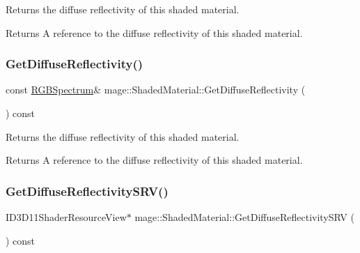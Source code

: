 Returns the diffuse reflectivity of this shaded material.

\begin{DoxyReturn}{Returns}
A reference to the diffuse reflectivity of this shaded material. 
\end{DoxyReturn}
\hypertarget{structmage_1_1_shaded_material_ae2c5d441c51b40a3c940785a002f59ec}{}\label{structmage_1_1_shaded_material_ae2c5d441c51b40a3c940785a002f59ec} 
\subsubsection{\texorpdfstring{Get\+Diffuse\+Reflectivity()}{GetDiffuseReflectivity()}\hspace{0.1cm}{\footnotesize\ttfamily [2/2]}}
{\footnotesize\ttfamily const \hyperlink{structmage_1_1_r_g_b_spectrum}{R\+G\+B\+Spectrum}\& mage\+::\+Shaded\+Material\+::\+Get\+Diffuse\+Reflectivity (\begin{DoxyParamCaption}{ }\end{DoxyParamCaption}) const\hspace{0.3cm}{\ttfamily [noexcept]}}

Returns the diffuse reflectivity of this shaded material.

\begin{DoxyReturn}{Returns}
A reference to the diffuse reflectivity of this shaded material. 
\end{DoxyReturn}
\hypertarget{structmage_1_1_shaded_material_a4e163bd276e41b01973a5d968f6f5716}{}\label{structmage_1_1_shaded_material_a4e163bd276e41b01973a5d968f6f5716} 
\subsubsection{\texorpdfstring{Get\+Diffuse\+Reflectivity\+S\+R\+V()}{GetDiffuseReflectivitySRV()}}
{\footnotesize\ttfamily I\+D3\+D11\+Shader\+Resource\+View$\ast$ mage\+::\+Shaded\+Material\+::\+Get\+Diffuse\+Reflectivity\+S\+RV (\begin{DoxyParamCaption}{ }\end{DoxyParamCaption}) const\hspace{0.3cm}{\ttfamily [noexcept]}}

